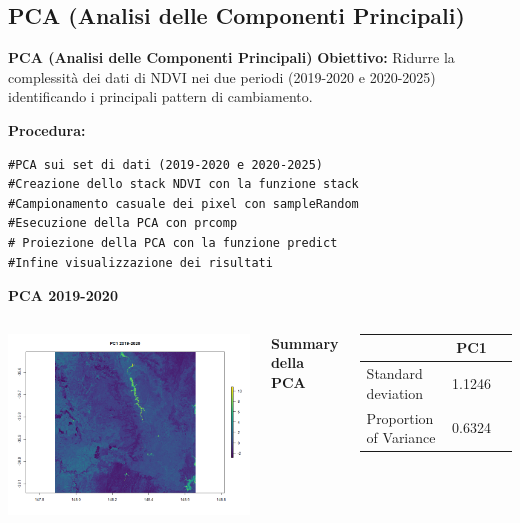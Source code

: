\documentclass{beamer}
\begin{document}
\subsection{PCA (Analisi delle Componenti Principali)}

\begin{frame}[fragile]{\textbf{PCA (Analisi delle Componenti Principali)}}
\textbf{Obiettivo:} Ridurre la complessità dei dati di NDVI nei due periodi (2019-2020 e 2020-2025) identificando i principali pattern di cambiamento.

\newline
\newline
\textbf{Procedura:}
\begin{lstlisting}
#PCA sui set di dati (2019-2020 e 2020-2025)
#Creazione dello stack NDVI con la funzione stack
#Campionamento casuale dei pixel con sampleRandom
#Esecuzione della PCA con prcomp
# Proiezione della PCA con la funzione predict
#Infine visualizzazione dei risultati
\end{lstlisting}
\end{frame}

\begin{frame}{\textbf{PCA 2019-2020}}
\begin{columns}
    \centering
    \includegraphics[width=\textwidth]{PCA_PC1_2019_2020.png}
    
    \centering
    \textbf{Summary della PCA}
    \begin{table}
        \centering
        \begin{tabular}{lcc}
            \toprule
            & PC1 \\
            \midrule
            Standard deviation     & 1.1246  \\
            Proportion of Variance & 0.6324 \\
            \bottomrule
        \end{tabular}
    \end{table}
\end{columns}
\end{frame}
\end{document}
